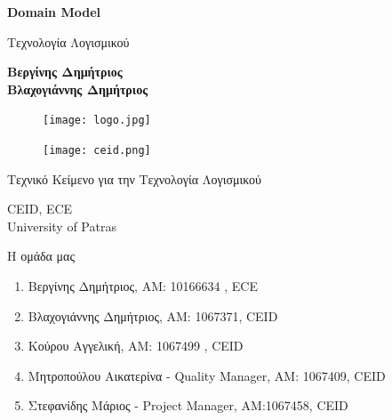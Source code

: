 \documentclass{article}
\begin{document}
\begin{titlepage}
   \begin{center}
       \vspace*{1cm}

       \textbf{\huge Domain Model}

       \vspace{0.5cm}
        Τεχνολογία Λογισμικού
            
       \vspace{1cm}

       \textbf{Βεργίνης Δημήτριος\\Βλαχογιάννης Δημήτριος}
       
       \begin{figure}[!htb]
        \centering
        \texttt{[image: logo.jpg]}
        \end{figure}
        
        \vspace{0.5cm}
        
        \begin{figure}[!htb]
        \centering
        \texttt{[image: ceid.png]}
        \end{figure}


       \vfill
            
       Τεχνικό Κείμενο για την Τεχνολογία Λογισμικού\\
            
       \vspace{0.5cm}
            
       CEID, ECE\\
       University of Patras\\
            
   \end{center}
\end{titlepage}

\noindent Η ομάδα μας

\begin{enumerate}
  \item Βεργίνης Δημήτριος, ΑΜ: 10166634 , ECE
  \item Βλαχογιάννης Δημήτριος, ΑΜ: 1067371, CEID
  \item Κούρου Αγγελική, ΑΜ: 1067499 , CEID
  \item Μητροπούλου Αικατερίνα - Quality Manager, ΑΜ: 1067409, CEID
  \item Στεφανίδης Μάριος - Project Manager, ΑΜ:1067458, CEID
\end{enumerate}
{
  \hypersetup{linkcolor=black}
  \tableofcontents
}
\end{document}
